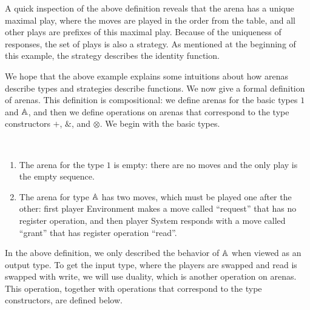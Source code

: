 \begin{example}
    A quick inspection of the above definition reveals that the arena has a unique maximal play, where the moves are played in the order from the table, and all other plays are prefixes of this maximal play. Because of the uniqueness of responses, the set of plays is also a strategy. As mentioned at the beginning of this example, the strategy describes the identity function.  \exampleend
\end{example}

We hope that the above example explains some intuitions about how arenas describe types and strategies describe functions. We now give a formal definition of arenas. This definition is compositional: we define arenas for the basic types $1$ and $\mathbb A$, and then we define operations on arenas that correspond to the type constructors  $+$, $\&$, and $\otimes$. We begin with the basic types.


\begin{definition}\label{def:arenas-without-atoms-or-functions} \ 
    \begin{enumerate}
        \item     The arena for the type $1$ is empty: there are no moves and the only play is the empty sequence. 
        \item The arena for type $\mathbb A$ has two moves, which must be played one after the other: first player Environment makes a move called ``request'' that has no register operation, and then player System responds with  a move called ``grant'' that has register operation ``read''.
    \end{enumerate}
\end{definition}

In the above definition, we only described the behavior of $\mathbb A$ when viewed as an output type. To get the input type, where the players are swapped and read is swapped with write, we will use duality, which is another operation on arenas. This operation, together with operations that correspond to the type constructors, are defined below.   

